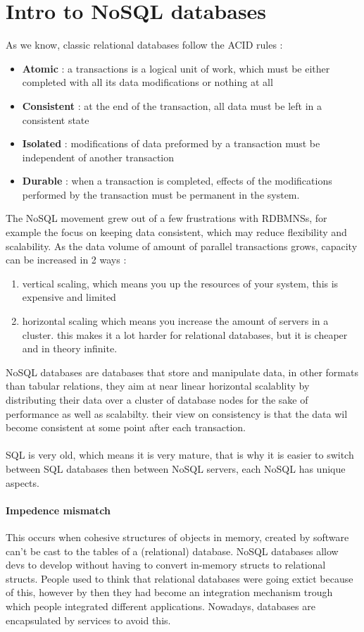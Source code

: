 \documentclass{report}
\begin{document}
	\chapter{Intro to NoSQL databases}
		As we know, classic relational databases follow the ACID rules : 
		\begin{itemize}
			\item \textbf{Atomic} : a transactions is a logical unit of work, which must be either completed with all its data modifications or nothing at all
			\item \textbf{Consistent} : at the end of the transaction, all data must be left in a consistent state
			\item \textbf{Isolated} : modifications of data preformed by a transaction must be independent of another transaction
			\item \textbf{Durable} : when a transaction is completed, effects of the modifications performed by the transaction must be permanent in the system.
		\end{itemize}
		The NoSQL movement grew out of a few frustrations with RDBMNSs, for example the focus on keeping data consistent, which may reduce flexibility and scalability. As the data volume of amount of parallel transactions grows, capacity can be increased in 2 ways : 
		\begin{enumerate}
			\item vertical scaling, which means you up the resources of your system, this is expensive and limited
			\item horizontal scaling which means you increase the amount of servers in a cluster. this makes it a lot harder for relational databases, but it is cheaper and in theory infinite.
		\end{enumerate}
		NoSQL databases are databases that store and manipulate data, in other formats than tabular relations, they aim at near linear horizontal scalablity by distributing their data over a cluster of database nodes for the sake of performance as well as scalabilty. their view on consistency is that the data wil become consistent at some point after each transaction.
		\\
		\\
		SQL is very old, which means it is very mature, that is why it is easier to switch between SQL databases then between NoSQL servers, each NoSQL has unique aspects.
		\subsubsection{Impedence mismatch}
			This occurs when cohesive structures of objects in memory, created by software can't be cast to the tables of a (relational) database.
			NoSQL databases allow devs to develop without having to convert in-memory structs to relational structs. People used to think that relational databases were going extict because of this, however by then they had become an integration mechanism trough which people integrated different applications.
			Nowadays, databases are encapsulated by services to avoid this.
\end{document}
